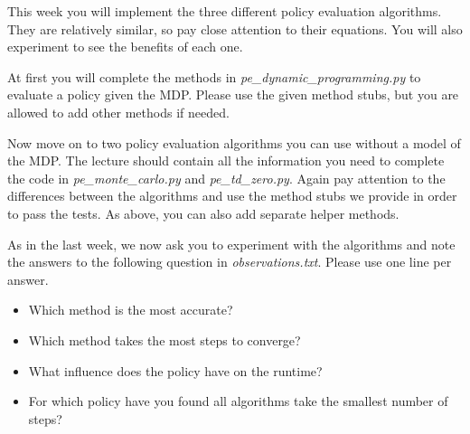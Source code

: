 \documentclass{exam}
\begin{document}
\noindent
This week you will implement the three different policy evaluation algorithms. They are relatively similar, so pay close attention to their equations. You will also experiment to see the benefits of each one.

\begin{questions}
	At first you will complete the methods in \emph{pe\_dynamic\_programming.py} to evaluate a policy given the MDP.  Please use the given method stubs, but you are allowed to add other methods if needed.  
	
	Now move on to two policy evaluation algorithms you can use without a model of the MDP.  The lecture should contain all the information you need to complete the code in \emph{pe\_monte\_carlo.py} and \emph{pe\_td\_zero.py}. Again pay attention to the differences between the algorithms and use the method stubs we provide in order to pass the tests. As above, you can also add separate helper methods.
	
	As in the last week, we now ask you to experiment with the algorithms and note the answers to the following question in \emph{observations.txt}. Please use one line per answer.
	\begin{itemize}
		\item Which method is the most accurate?
		\item Which method takes the most steps to converge?
		\item What influence does the policy have on the runtime?
		\item For which policy have you found all algorithms take the smallest number of steps?
	\end{itemize}
\end{questions}
\end{document}
